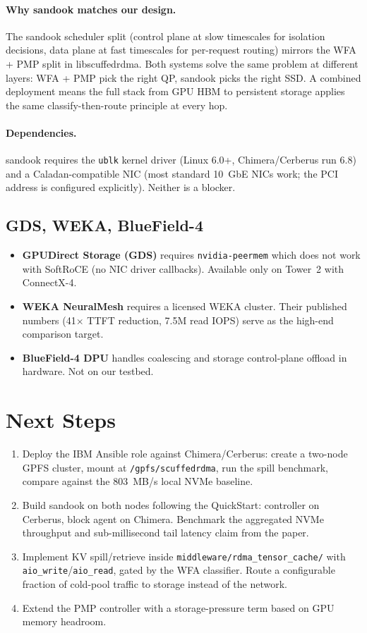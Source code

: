 \documentclass[11pt,letterpaper]{article}
\begin{document}
\paragraph{Why sandook matches our design.} The sandook scheduler split (control plane at slow timescales for isolation decisions, data plane at fast timescales for per-request routing) mirrors the WFA + PMP split in libscuffedrdma. Both systems solve the same problem at different layers: WFA + PMP pick the right QP, sandook picks the right SSD. A combined deployment means the full stack from GPU HBM to persistent storage applies the same classify-then-route principle at every hop.

\paragraph{Dependencies.} sandook requires the \texttt{ublk} kernel driver (Linux 6.0+, Chimera/Cerberus run 6.8) and a Caladan-compatible NIC (most standard 10~GbE NICs work; the PCI address is configured explicitly). Neither is a blocker.

\subsection{GDS, WEKA, BlueField-4}

\begin{itemize}
\item \textbf{GPUDirect Storage (GDS)} requires \texttt{nvidia-peermem} which does not work with SoftRoCE (no NIC driver callbacks). Available only on Tower~2 with ConnectX-4.
\item \textbf{WEKA NeuralMesh} requires a licensed WEKA cluster. Their published numbers (41$\times$ TTFT reduction, 7.5M read IOPS) serve as the high-end comparison target.
\item \textbf{BlueField-4 DPU} handles coalescing and storage control-plane offload in hardware. Not on our testbed.
\end{itemize}

\section{Next Steps}

\begin{enumerate}
\item Deploy the IBM Ansible role against Chimera/Cerberus: create a two-node GPFS cluster, mount at \texttt{/gpfs/scuffedrdma}, run the spill benchmark, compare against the 803~MB/s local NVMe baseline.
\item Build sandook on both nodes following the QuickStart: controller on Cerberus, block agent on Chimera. Benchmark the aggregated NVMe throughput and sub-millisecond tail latency claim from the paper.
\item Implement KV spill/retrieve inside \texttt{middleware/rdma\_tensor\_cache/} with \texttt{aio\_write}/\texttt{aio\_read}, gated by the WFA classifier. Route a configurable fraction of cold-pool traffic to storage instead of the network.
\item Extend the PMP controller with a storage-pressure term based on GPU memory headroom.
\end{enumerate}
\end{document}

